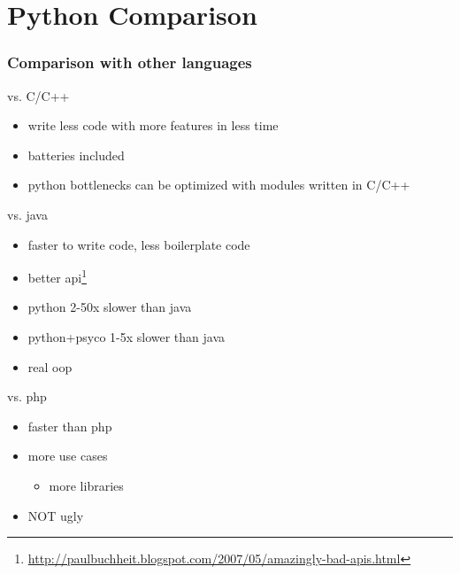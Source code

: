 \documentclass{beamer}
\begin{document}
\section{Python Comparison}	%
\begin{frame}
    \frametitle{Comparison with other languages}
    \begin{block}{vs. C/C++}
    \begin{itemize}
        \item write less code with more features in less time
        \item batteries included
        \item python bottlenecks can be optimized with modules written in C/C++
    \end{itemize}
    \end{block}

    \begin{block}{vs. java}
    \begin{itemize}
        \item faster to write code, less boilerplate code
        \item better api\footnote{\url{http://paulbuchheit.blogspot.com/2007/05/amazingly-bad-apis.html}}
        \item python 2-50x slower than java
        \item python+psyco 1-5x slower than java
        \item real oop
    \end{itemize}
    \end{block}
    
    \begin{block}{vs. php}
    \begin{itemize}
        \item faster than php
        \item more use cases
        \begin{itemize}
        	\item more libraries
        \end{itemize}
        \item NOT ugly
    \end{itemize}
    \end{block}


\end{frame}
\end{document}

